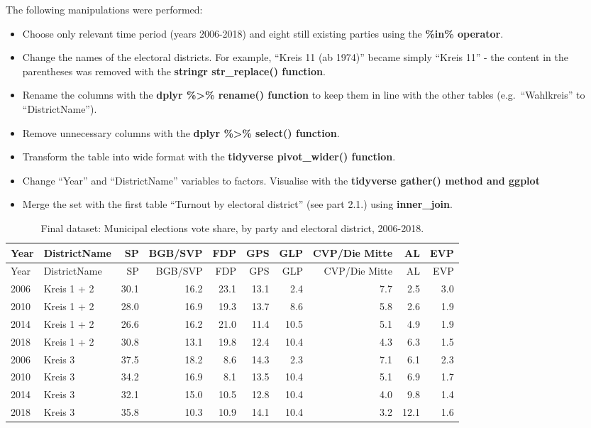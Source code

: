 \documentclass[
]{article}
\providecommand{\tightlist}{%
  \setlength{\itemsep}{0pt}\setlength{\parskip}{0pt}}
\begin{document}
The following manipulations were performed:

\begin{itemize}
\tightlist
\item
  Choose only relevant time period (years 2006-2018) and eight still
  existing parties using the \textbf{\%in\% operator}.
\item
  Change the names of the electoral districts. For example, ``Kreis 11
  (ab 1974)'' became simply ``Kreis 11'' - the content in the
  parentheses was removed with the \textbf{stringr str\_replace()
  function}.
\item
  Rename the columns with the \textbf{dplyr \%\textgreater\% rename()
  function} to keep them in line with the other tables
  (e.g.~``Wahlkreis'' to ``DistrictName'').
\item
  Remove unnecessary columns with the \textbf{dplyr \%\textgreater\%
  select() function}.
\item
  Transform the table into wide format with the \textbf{tidyverse
  pivot\_wider() function}.
\item
  Change ``Year'' and ``DistrictName'' variables to factors. Visualise
  with the \textbf{tidyverse gather() method and ggplot}
\item
  Merge the set with the first table ``Turnout by electoral district''
  (see part 2.1.) using \textbf{inner\_join}.
\end{itemize}

\begin{longtable}[]{@{}llrrrrrrrr@{}}
\caption{Final dataset: Municipal elections vote share, by party and
electoral district, 2006-2018.}\tabularnewline
\toprule
Year & DistrictName & SP & BGB/SVP & FDP & GPS & GLP & CVP/Die Mitte &
AL & EVP \\
\midrule
\endfirsthead
\toprule
Year & DistrictName & SP & BGB/SVP & FDP & GPS & GLP & CVP/Die Mitte &
AL & EVP \\
\midrule
\endhead
2006 & Kreis 1 + 2 & 30.1 & 16.2 & 23.1 & 13.1 & 2.4 & 7.7 & 2.5 &
3.0 \\
2010 & Kreis 1 + 2 & 28.0 & 16.9 & 19.3 & 13.7 & 8.6 & 5.8 & 2.6 &
1.9 \\
2014 & Kreis 1 + 2 & 26.6 & 16.2 & 21.0 & 11.4 & 10.5 & 5.1 & 4.9 &
1.9 \\
2018 & Kreis 1 + 2 & 30.8 & 13.1 & 19.8 & 12.4 & 10.4 & 4.3 & 6.3 &
1.5 \\
2006 & Kreis 3 & 37.5 & 18.2 & 8.6 & 14.3 & 2.3 & 7.1 & 6.1 & 2.3 \\
2010 & Kreis 3 & 34.2 & 16.9 & 8.1 & 13.5 & 10.4 & 5.1 & 6.9 & 1.7 \\
2014 & Kreis 3 & 32.1 & 15.0 & 10.5 & 12.8 & 10.4 & 4.0 & 9.8 & 1.4 \\
2018 & Kreis 3 & 35.8 & 10.3 & 10.9 & 14.1 & 10.4 & 3.2 & 12.1 & 1.6 \\
\bottomrule
\end{longtable}
\end{document}
